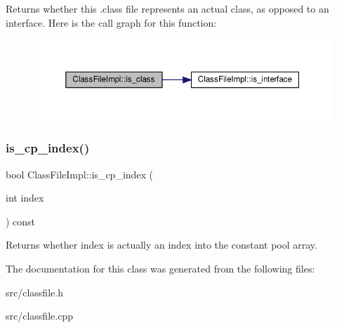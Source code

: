 Returns whether this .class file represents an actual class, as opposed to an interface. Here is the call graph for this function\+:\nopagebreak
\begin{figure}[H]
\begin{center}
\leavevmode
\includegraphics[width=350pt]{classClassFileImpl_a3772a57b8eaadf252a9a9f36c063ab93_cgraph}
\end{center}
\end{figure}
\mbox{\label{classClassFileImpl_a1f15226f5107cb036e81d480531cda08}} 
\subsubsection{\texorpdfstring{is\+\_\+cp\+\_\+index()}{is\_cp\_index()}}
{\footnotesize\ttfamily bool Class\+File\+Impl\+::is\+\_\+cp\+\_\+index (\begin{DoxyParamCaption}\item[{int}]{index }\end{DoxyParamCaption}) const}

Returns whether {\ttfamily index} is actually an index into the constant pool array. 

The documentation for this class was generated from the following files\+:\begin{DoxyCompactItemize}
\item 
src/classfile.\+h\item 
src/classfile.\+cpp\end{DoxyCompactItemize}
